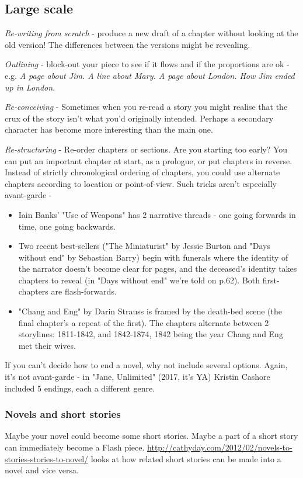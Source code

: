 \documentclass[11pt]{article}
\begin{document}
\subsection*{Large scale}
\textit{Re-writing from scratch} - produce a new draft of a chapter without looking at the old version! The differences between the versions might be revealing. 

 \textit{Outlining} - block-out your piece to see if it flows and if the proportions are ok - e.g. \textit{A page about Jim. A line about Mary. A page about London. How Jim ended up in London}. 

 \textit{Re-conceiving} - Sometimes when you re-read a story you might realise that the crux of the story isn't what you'd originally intended. Perhaps a secondary character has become more interesting than the main one. 

 \textit{Re-structuring} - Re-order chapters or sections. Are you starting too early?  You can put an important chapter at start, as a prologue, or put chapters in reverse. Instead of strictly chronological ordering of chapters, you could use alternate chapters according to location or point-of-view. Such tricks aren't especially avant-garde -
\begin{itemize}
\item  Iain Banks' "Use of Weapons" has 2 narrative threads - one going forwards in time, one going backwards.

\item Two recent best-sellers ("The Miniaturist" by Jessie Burton and  "Days without end" by Sebastian Barry) begin with funerals where the identity of the narrator doesn't become clear for pages, and the deceased's identity takes chapters to reveal (in "Days without end" we're told on p.62). Both first-chapters are flash-forwards. 

\item "Chang and Eng" by Darin Strauss is framed by the death-bed scene (the final chapter's a repeat of the first). The chapters alternate between 2 storylines: 1811-1842, and 1842-1874, 1842 being the year Chang and Eng met their wives. 
\end{itemize}

If you can't decide how to end a novel, why not include several options. Again, it's not avant-garde - in "Jane, Unlimited" (2017, it's YA) Kristin Cashore included 5 endings, each a different genre. 

\subsubsection*{Novels and short stories}
Maybe your novel could become some short stories. Maybe a part of a short story can immediately become a Flash piece. \url{http://cathyday.com/2012/02/novels-to-stories-stories-to-novel/} looks at how related short stories can be made into a novel and vice versa.
\end{document}
